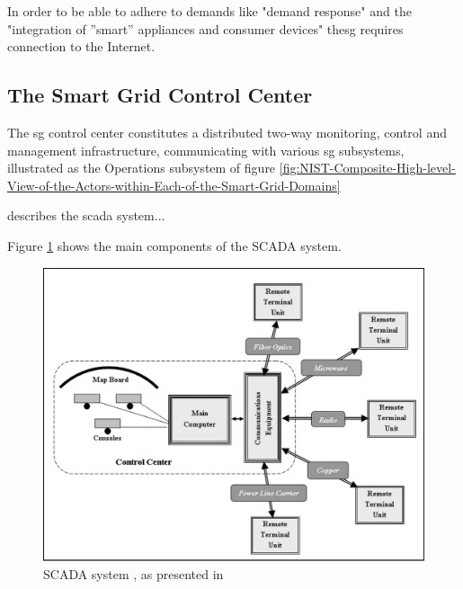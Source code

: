 In order to be able to adhere to demands like "demand response" and the "integration of ''smart'' appliances and consumer devices" the\acrlong{sg} requires connection to the Internet.\\









\subsection{The Smart Grid Control Center}
The \acrlong{sg} control center constitutes a distributed two-way monitoring, control and management infrastructure, communicating with various \acrlong{sg} subsystems, illustrated as the Operations subsystem of figure  \ref{fig:NIST-Composite-High-level-View-of-the-Actors-within-Each-of-the-Smart-Grid-Domains}



\cite{alcaraz2012security} describes the \acrlong{scada} system...















Figure \ref{fig:Blume-SCADA-system} shows the main components of the SCADA system.

\begin{figure}[ht]
\includegraphics[width=\linewidth]{figures/Blume-SCADA-system.png}
\caption{SCADA system , as presented in \cite{BlumeStevenW2007Epsb}}
\label{fig:Blume-SCADA-system}
\end{figure}



